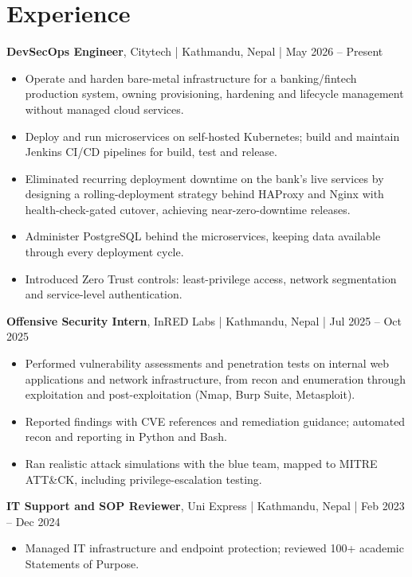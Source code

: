 \documentclass[10pt]{article}
\newcommand{\job}[4]{%
    \textbf{#1}, #2 {\color{darkgray}| #4 | #3}\par}
\begin{document}
\section{Experience}
\job{DevSecOps Engineer}{Citytech}{May 2026 -- Present}{Kathmandu, Nepal}
\begin{itemize}
    \item Operate and harden bare-metal infrastructure for a banking/fintech production system, owning provisioning, hardening and lifecycle management without managed cloud services.
    \item Deploy and run microservices on self-hosted Kubernetes; build and maintain Jenkins CI/CD pipelines for build, test and release.
    \item Eliminated recurring deployment downtime on the bank's live services by designing a rolling-deployment strategy behind HAProxy and Nginx with health-check-gated cutover, achieving near-zero-downtime releases.
    \item Administer PostgreSQL behind the microservices, keeping data available through every deployment cycle.
    \item Introduced Zero Trust controls: least-privilege access, network segmentation and service-level authentication.
\end{itemize}

\vspace{2pt}
\job{Offensive Security Intern}{InRED Labs}{Jul 2025 -- Oct 2025}{Kathmandu, Nepal}
\begin{itemize}
    \item Performed vulnerability assessments and penetration tests on internal web applications and network infrastructure, from recon and enumeration through exploitation and post-exploitation (Nmap, Burp Suite, Metasploit).
    \item Reported findings with CVE references and remediation guidance; automated recon and reporting in Python and Bash.
    \item Ran realistic attack simulations with the blue team, mapped to MITRE ATT\&CK, including privilege-escalation testing.
\end{itemize}

\vspace{2pt}
\job{IT Support and SOP Reviewer}{Uni Express}{Feb 2023 -- Dec 2024}{Kathmandu, Nepal}
\begin{itemize}
    \item Managed IT infrastructure and endpoint protection; reviewed 100+ academic Statements of Purpose.
\end{itemize}
\end{document}
